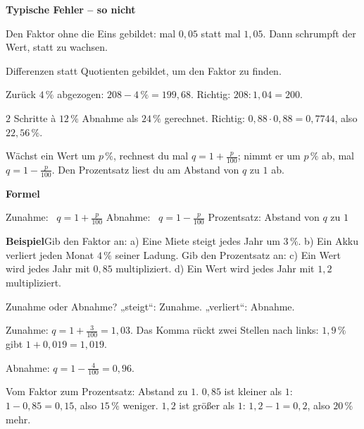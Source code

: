 \documentclass[11pt]{article}
\newcommand{\nr}[1]{\makebox[7mm][l]{\textbf{#1}}}
\begin{document}
\medskip\noindent\textbf{Typische Fehler – so nicht}\par\smallskip
\noindent\nr{$\times$}Den Faktor ohne die Eins gebildet: mal $0{,}05$ statt mal $1{,}05$. Dann schrumpft der Wert, statt zu wachsen.\par
\noindent\nr{$\times$}Differenzen statt Quotienten gebildet, um den Faktor zu finden.\par
\noindent\nr{$\times$}Zurück $4\,\%$ abgezogen: $208 - 4\,\% = 199{,}68$. Richtig: $208 : 1{,}04 = 200$.\par
\noindent\nr{$\times$}$2$ Schritte à $12\,\%$ Abnahme als $24\,\%$ gerechnet. Richtig: $0{,}88 \cdot 0{,}88 = 0{,}7744$, also $22{,}56\,\%$.\par
\clearpage\label{s:A}\noindent\colorbox{black!12}{}\hspace{3mm}{\Large\bfseries Faktor und Prozentsatz}\par\smallskip
\noindent Wächst ein Wert um $p\,\%$, rechnest du mal $q = 1 + \frac{p}{100}$; nimmt er um $p\,\%$ ab, mal $q = 1 - \frac{p}{100}$. Den Prozentsatz liest du am Abstand von $q$ zu $1$ ab.\par\medskip
\noindent\textbf{Formel}\par\nopagebreak\noindent\hspace*{4mm}\begin{minipage}{\dimexpr\linewidth-4mm\relax}Zunahme: \ $q = 1 + \frac{p}{100}$ \qquad Abnahme: \ $q = 1 - \frac{p}{100}$ \qquad Prozentsatz: Abstand von $q$ zu $1$\end{minipage}\par\medskip
\noindent\textbf{Beispiel}\quad Gib den Faktor an: a) Eine Miete steigt jedes Jahr um $3\,\%$. b) Ein Akku verliert jeden Monat $4\,\%$ seiner Ladung. Gib den Prozentsatz an: c) Ein Wert wird jedes Jahr mit $0{,}85$ multipliziert. d) Ein Wert wird jedes Jahr mit $1{,}2$ multipliziert.\par\smallskip
\noindent\par\noindent{}Zunahme oder Abnahme? „steigt“: Zunahme. „verliert“: Abnahme.\par\smallskip\par\noindent{}Zunahme: $q = 1 + \frac{3}{100} = 1{,}03$. Das Komma rückt zwei Stellen nach links: $1{,}9\,\%$ gibt $1 + 0{,}019 = 1{,}019$.\par\smallskip\par\noindent{}Abnahme: $q = 1 - \frac{4}{100} = 0{,}96$.\par\smallskip\par\noindent{}Vom Faktor zum Prozentsatz: Abstand zu $1$. $0{,}85$ ist kleiner als $1$: $1 - 0{,}85 = 0{,}15$, also $15\,\%$ weniger. $1{,}2$ ist größer als $1$: $1{,}2 - 1 = 0{,}2$, also $20\,\%$ mehr.\par\smallskip\par\medskip
\end{document}
